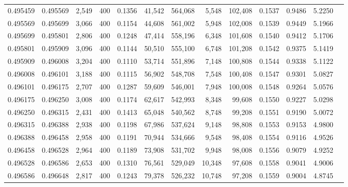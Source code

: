 \begin{tabular}{rrrrrrrrrrrrr}
0.495459 & 0.495569 & 2,549 & 400 &                                     0.1356 &  41,542 & 564,068 &   5,548 & 102,408 & 0.1537 & 0.9486 & 5.2250 \\
0.495569 & 0.495699 & 3,066 & 400 &                                     0.1154 &  44,608 & 561,002 &   5,948 & 102,008 & 0.1539 & 0.9449 & 5.1966 \\
0.495699 & 0.495801 & 2,806 & 400 &                                     0.1248 &  47,414 & 558,196 &   6,348 & 101,608 & 0.1540 & 0.9412 & 5.1706 \\
0.495801 & 0.495909 & 3,096 & 400 &                                     0.1144 &  50,510 & 555,100 &   6,748 & 101,208 & 0.1542 & 0.9375 & 5.1419 \\
0.495909 & 0.496008 & 3,204 & 400 &                                     0.1110 &  53,714 & 551,896 &   7,148 & 100,808 & 0.1544 & 0.9338 & 5.1122 \\
0.496008 & 0.496101 & 3,188 & 400 &                                     0.1115 &  56,902 & 548,708 &   7,548 & 100,408 & 0.1547 & 0.9301 & 5.0827 \\
0.496101 & 0.496175 & 2,707 & 400 &                                     0.1287 &  59,609 & 546,001 &   7,948 & 100,008 & 0.1548 & 0.9264 & 5.0576 \\
0.496175 & 0.496250 & 3,008 & 400 &                                     0.1174 &  62,617 & 542,993 &   8,348 &  99,608 & 0.1550 & 0.9227 & 5.0298 \\
0.496250 & 0.496315 & 2,431 & 400 &                                     0.1413 &  65,048 & 540,562 &   8,748 &  99,208 & 0.1551 & 0.9190 & 5.0072 \\
0.496315 & 0.496388 & 2,938 & 400 &                                     0.1198 &  67,986 & 537,624 &   9,148 &  98,808 & 0.1553 & 0.9153 & 4.9800 \\
0.496388 & 0.496458 & 2,958 & 400 &                                     0.1191 &  70,944 & 534,666 &   9,548 &  98,408 & 0.1554 & 0.9116 & 4.9526 \\
0.496458 & 0.496528 & 2,964 & 400 &                                     0.1189 &  73,908 & 531,702 &   9,948 &  98,008 & 0.1556 & 0.9079 & 4.9252 \\
0.496528 & 0.496586 & 2,653 & 400 &                                     0.1310 &  76,561 & 529,049 &  10,348 &  97,608 & 0.1558 & 0.9041 & 4.9006 \\
0.496586 & 0.496648 & 2,817 & 400 &                                     0.1243 &  79,378 & 526,232 &  10,748 &  97,208 & 0.1559 & 0.9004 & 4.8745 \\

\end{tabular}
